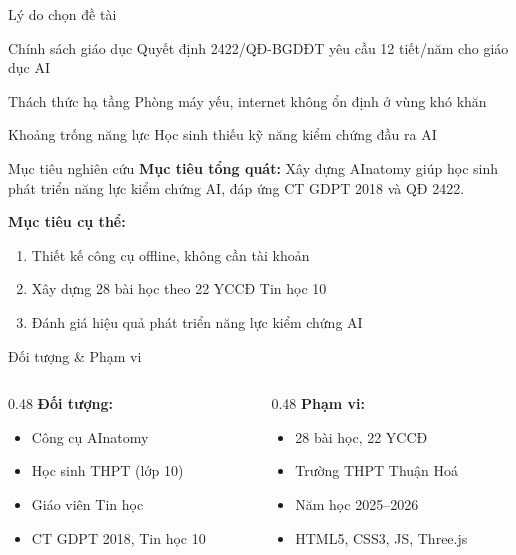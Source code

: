 \documentclass[10pt,xcolor=dvipsnames]{beamer}
\begin{document}
\begin{frame}{Lý do chọn đề tài}
  \begin{block}{Chính sách giáo dục}
    Quyết định 2422/QĐ-BGDĐT yêu cầu 12 tiết/năm cho giáo dục AI
  \end{block}
  
  \begin{block}{Thách thức hạ tầng}
    Phòng máy yếu, internet không ổn định ở vùng khó khăn
  \end{block}
  
  \begin{block}{Khoảng trống năng lực}
    Học sinh thiếu kỹ năng kiểm chứng đầu ra AI
  \end{block}
\end{frame}

\begin{frame}{Mục tiêu nghiên cứu}
  \textbf{Mục tiêu tổng quát:} Xây dựng AInatomy giúp học sinh phát triển năng lực kiểm chứng AI, đáp ứng CT GDPT 2018 và QĐ 2422.
  
  \vspace{1em}
  \textbf{Mục tiêu cụ thể:}
  \begin{enumerate}
    \item Thiết kế công cụ offline, không cần tài khoản
    \item Xây dựng 28 bài học theo 22 YCCĐ Tin học 10
    \item Đánh giá hiệu quả phát triển năng lực kiểm chứng AI
  \end{enumerate}
\end{frame}

\begin{frame}{Đối tượng \& Phạm vi}
  \begin{columns}[T]
    \begin{column}{0.48\textwidth}
      \textbf{Đối tượng:}
      \begin{itemize}
        \item Công cụ AInatomy
        \item Học sinh THPT (lớp 10)
        \item Giáo viên Tin học
        \item CT GDPT 2018, Tin học 10
      \end{itemize}
    \end{column}
    
    \begin{column}{0.48\textwidth}
      \textbf{Phạm vi:}
      \begin{itemize}
        \item 28 bài học, 22 YCCĐ
        \item Trường THPT Thuận Hoá
        \item Năm học 2025--2026
        \item HTML5, CSS3, JS, Three.js
      \end{itemize}
    \end{column}
  \end{columns}
\end{frame}
\end{document}
